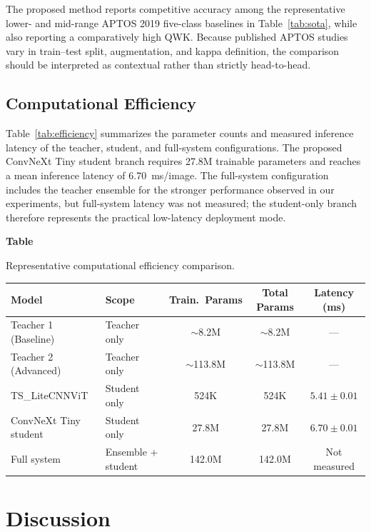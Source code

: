 \documentclass[a4paper,fleqn]{cas-dc}
\newcommand{\lefttablecaption}[2]{%
  \refstepcounter{table}\label{#1}%
  {\raggedright
  \textbf{Table~\thetable}\par\vspace{-2pt}
  #2\par}
}
\begin{document}
\FloatBarrier

The proposed method reports competitive accuracy among the representative lower- and mid-range APTOS 2019 five-class baselines in Table~\ref{tab:sota}, while also reporting a comparatively high QWK. Because published APTOS studies vary in train--test split, augmentation, and kappa definition, the comparison should be interpreted as contextual rather than strictly head-to-head.

\subsection{Computational Efficiency}

Table~\ref{tab:efficiency} summarizes the parameter counts and measured inference latency of the teacher, student, and full-system configurations. The proposed ConvNeXt Tiny student branch requires 27.8M trainable parameters and reaches a mean inference latency of 6.70~ms/image. The full-system configuration includes the teacher ensemble for the stronger performance observed in our experiments, but full-system latency was not measured; the student-only branch therefore represents the practical low-latency deployment mode.

\begin{strip}
\raggedright
\lefttablecaption{tab:efficiency}{Representative computational efficiency comparison.}
\begin{tabular*}{\textwidth}{@{\extracolsep{\fill}}llccc@{}}
\toprule
Model & Scope & Train.\ Params & Total Params & Latency (ms) \\
\midrule
Teacher 1 (Baseline) & Teacher only & $\sim$8.2M & $\sim$8.2M & --- \\
Teacher 2 (Advanced) & Teacher only & $\sim$113.8M & $\sim$113.8M & --- \\
TS\_LiteCNNViT & Student only & 524K & 524K & $5.41 \pm 0.01$ \\
ConvNeXt Tiny student & Student only & 27.8M & 27.8M & $\mathbf{6.70 \pm 0.01}$ \\
Full system & Ensemble + student & 142.0M & 142.0M & Not measured \\
\bottomrule
\end{tabular*}
\end{strip}

\FloatBarrier


\section{Discussion}
\label{sec:discussion}
\end{document}
